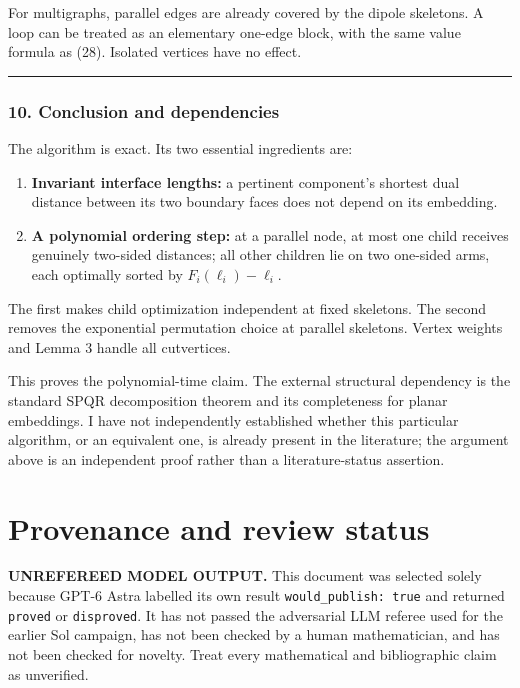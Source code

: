 \documentclass[
  11pt,
  a4paper,
]{article}
\providecommand{\tightlist}{%
  \setlength{\itemsep}{0pt}\setlength{\parskip}{0pt}}
\begin{document}
For multigraphs, parallel edges are already covered by the dipole
skeletons. A loop can be treated as an elementary one-edge block, with
the same value formula as (28). Isolated vertices have no effect.

\begin{center}\rule{0.5\linewidth}{0.5pt}\end{center}

\subsubsection{10. Conclusion and
dependencies}\label{conclusion-and-dependencies}

The algorithm is exact. Its two essential ingredients are:

\begin{enumerate}
\def\labelenumi{\arabic{enumi}.}
\tightlist
\item
  \textbf{Invariant interface lengths:} a pertinent component's shortest
  dual distance between its two boundary faces does not depend on its
  embedding.
\item
  \textbf{A polynomial ordering step:} at a parallel node, at most one
  child receives genuinely two-sided distances; all other children lie
  on two one-sided arms, each optimally sorted by
  \(F_i(\ell_i)-\ell_i\).
\end{enumerate}

The first makes child optimization independent at fixed skeletons. The
second removes the exponential permutation choice at parallel skeletons.
Vertex weights and Lemma 3 handle all cutvertices.

This proves the polynomial-time claim. The external structural
dependency is the standard SPQR decomposition theorem and its
completeness for planar embeddings. I have not independently established
whether this particular algorithm, or an equivalent one, is already
present in the literature; the argument above is an independent proof
rather than a literature-status assertion.

\appendix

\section{Provenance and review
status}\label{provenance-and-review-status}

\begin{warning}

\textbf{UNREFEREED MODEL OUTPUT.} This document was selected solely
because GPT-6 Astra labelled its own result
\texttt{would\_publish:\ true} and returned \texttt{proved} or
\texttt{disproved}. It has not passed the adversarial LLM referee used
for the earlier Sol campaign, has not been checked by a human
mathematician, and has not been checked for novelty. Treat every
mathematical and bibliographic claim as unverified.

\end{warning}
\end{document}

